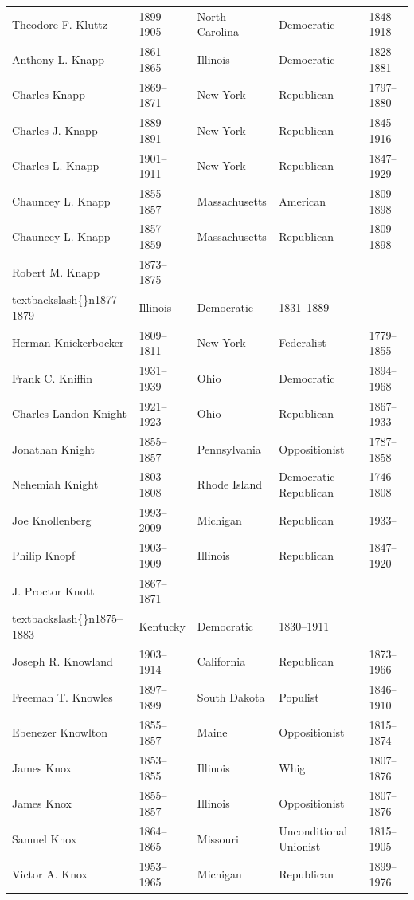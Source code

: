 \documentclass{article}
\begin{document}
\begin{tabular}{lllll}
Theodore F. Kluttz & 1899–1905 & North Carolina & Democratic & 1848–1918 \\
Anthony L. Knapp & 1861–1865 & Illinois & Democratic & 1828–1881 \\
Charles Knapp & 1869–1871 & New York & Republican & 1797–1880 \\
Charles J. Knapp & 1889–1891 & New York & Republican & 1845–1916 \\
Charles L. Knapp & 1901–1911 & New York & Republican & 1847–1929 \\
Chauncey L. Knapp & 1855–1857 & Massachusetts & American & 1809–1898 \\
Chauncey L. Knapp & 1857–1859 & Massachusetts & Republican & 1809–1898 \\
Robert M. Knapp & 1873–1875\\textbackslash\{\}n1877–1879 & Illinois & Democratic & 1831–1889 \\
Herman Knickerbocker & 1809–1811 & New York & Federalist & 1779–1855 \\
Frank C. Kniffin & 1931–1939 & Ohio & Democratic & 1894–1968 \\
Charles Landon Knight & 1921–1923 & Ohio & Republican & 1867–1933 \\
Jonathan Knight & 1855–1857 & Pennsylvania & Oppositionist & 1787–1858 \\
Nehemiah Knight & 1803–1808 & Rhode Island & Democratic-Republican & 1746–1808 \\
Joe Knollenberg & 1993–2009 & Michigan & Republican & 1933– \\
Philip Knopf & 1903–1909 & Illinois & Republican & 1847–1920 \\
J. Proctor Knott & 1867–1871\\textbackslash\{\}n1875–1883 & Kentucky & Democratic & 1830–1911 \\
Joseph R. Knowland & 1903–1914 & California & Republican & 1873–1966 \\
Freeman T. Knowles & 1897–1899 & South Dakota & Populist & 1846–1910 \\
Ebenezer Knowlton & 1855–1857 & Maine & Oppositionist & 1815–1874 \\
James Knox & 1853–1855 & Illinois & Whig & 1807–1876 \\
James Knox & 1855–1857 & Illinois & Oppositionist & 1807–1876 \\
Samuel Knox & 1864–1865 & Missouri & Unconditional Unionist & 1815–1905 \\
Victor A. Knox & 1953–1965 & Michigan & Republican & 1899–1976 \\

\end{tabular}
\end{document}
